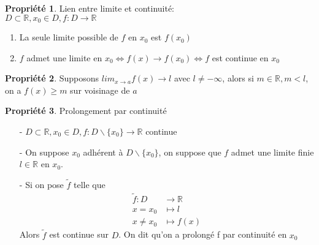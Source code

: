 \documentclass[fleqn]{article}
\theoremstyle{definition} \newtheorem*{defi}{D\'efinition}
\theoremstyle{definition} \newtheorem*{theo}{Th\'eor\`eme}
\theoremstyle{definition} \newtheorem*{prop}{Propri\'et\'e}
\theoremstyle{remark} \newtheorem*{rqs}{Remarques}
\begin{document}
\begin{prop} Lien entre limite et continuit\'e: \\
	$D \subset \mathbb{R}, x_0 \in D, f:D \rightarrow \mathbb{R}$
	\begin{enumerate}
		\item La seule limite possible de $f$ en $x_0$ est $f(x_0)$
		\item $f$ admet une limite en $x_0 \Leftrightarrow f(x) \rightarrow f(x_0) \Leftrightarrow f$ est continue en $x_0$
	\end{enumerate}
\end{prop}

\begin{prop}
	Supposons $lim_{x \to a} f(x) \rightarrow l$ avec $l \neq -\infty$, alors si $m \in \mathbb{R}, m < l$, on a $f(x) \geq m$
	sur voisinage de $a$
\end{prop}

\begin{prop} Prolongement par continuit\'e
	\begin{itemize}
		\item [-] $D \subset \mathbb{R}, x_0 \in D, f:D \backslash \{x_0\} \rightarrow \mathbb{R}$ continue
		\item [-] On suppose $x_0$ adh\'erent \`a $D \backslash \{x_0\}$, on suppose que $f$ admet une limite finie $l \in \mathbb{R}$
			en $x_0$.
		\item [-] Si on pose $\tilde{f}$ telle que
			\begin{align*}
				\tilde{f}: D &\rightarrow \mathbb{R} \\
				x = x_0 &\mapsto l \\
				x \neq x_0 &\mapsto f(x)
			\end{align*}
		Alors $\tilde{f}$ est continue sur $D$. On dit qu'on a prolong\'e f par continuit\'e en $x_0$
	\end{itemize}
\end{prop}
\end{document}
